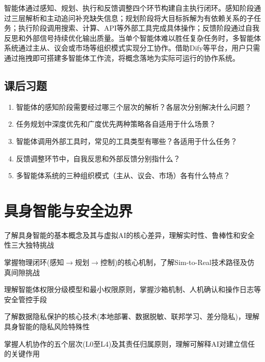 智能体通过感知、规划、执行和反馈调整四个环节构建自主执行闭环。感知阶段通过三层解析和主动追问补充缺失信息；规划阶段将大目标拆解为有依赖关系的子任务；执行阶段调用搜索、计算、API等外部工具完成具体操作；反馈阶段通过自我反思和外部信号持续优化输出质量。当单个智能体难以胜任复杂任务时，多智能体系统通过主从、议会或市场等组织模式实现分工协作。借助Dify等平台，用户只需通过拖拽即可搭建多智能体工作流，将概念落地为实际可运行的协作系统。

\bigskip
\subsection*{课后习题}

\begin{enumerate}
\setlength{\itemsep}{6pt}
\item 智能体的感知阶段需要经过哪三个层次的解析？各层次分别解决什么问题？
\item 任务规划中深度优先和广度优先两种策略各自适用于什么场景？
\item 智能体调用外部工具时，常见的工具类型有哪些？各适用于什么任务？
\item 反馈调整环节中，自我反思和外部反馈分别指什么？
\item 多智能体系统的三种组织模式（主从、议会、市场）各有什么特点？
\end{enumerate}

\newpage
\section{具身智能与安全边界}

\begin{sectionkeypoints}
\item 了解具身智能的基本概念及其与虚拟AI的核心差异，理解实时性、鲁棒性和安全性三大独特挑战
\item 掌握物理闭环(感知$\rightarrow$规划$\rightarrow$控制)的核心机制，了解Sim-to-Real技术路径及仿真间隙挑战
\item 理解智能体权限分级模型和最小权限原则，掌握沙箱机制、人机确认和操作日志等安全管控手段
\item 了解数据隐私保护的核心技术(本地部署、数据脱敏、联邦学习、差分隐私)，理解具身智能的隐私风险特殊性
\item 掌握人机协作的五个层次(L0至L4)及其责任归属原则，理解可解释AI对建立信任的关键作用
\end{sectionkeypoints}




